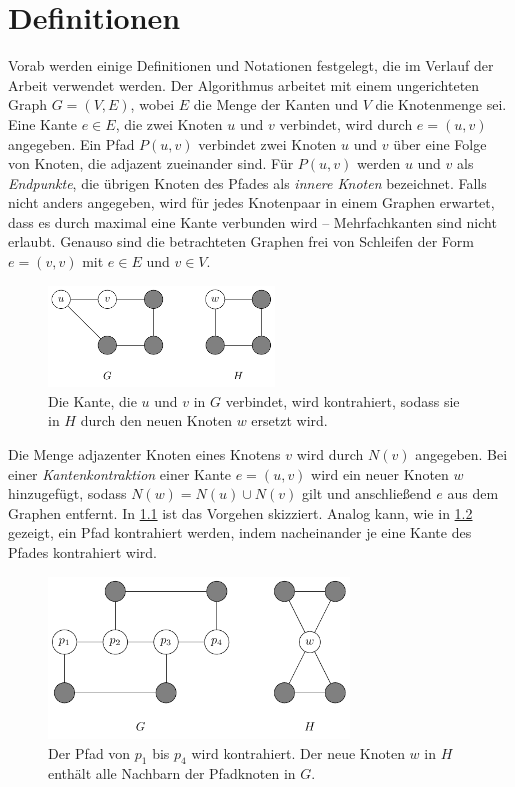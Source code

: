 \chapter{Definitionen}
\label{cha:definitionen}

Vorab werden einige Definitionen und Notationen festgelegt, die im Verlauf der Arbeit verwendet werden.
Der Algorithmus arbeitet mit einem ungerichteten Graph $G = (V, E)$, wobei $E$ die Menge der Kanten und $V$ die Knotenmenge sei.
Eine Kante $e \in E$, die zwei Knoten $u$ und $v$ verbindet, wird durch $e = (u, v)$ angegeben.
Ein Pfad $P(u, v)$ verbindet zwei Knoten $u$ und $v$ über eine Folge von Knoten, die adjazent zueinander sind.
Für $P(u, v)$ werden $u$ und $v$ als \emph{Endpunkte}, die übrigen Knoten des Pfades als \emph{innere Knoten} bezeichnet.
Falls nicht anders angegeben, wird für jedes Knotenpaar in einem Graphen erwartet, dass es durch maximal eine Kante verbunden wird -- Mehrfachkanten sind nicht erlaubt.
Genauso sind die betrachteten Graphen frei von Schleifen der Form $e = (v, v)$ mit $e \in E$ und $v \in V$.
\begin{figure}
  \includegraphics[width=6cm]{bilder/Kantenkontraktion.pdf}
  \caption{Die Kante, die $u$ und $v$ in $G$ verbindet, wird kontrahiert, sodass sie in $H$ durch den neuen Knoten $w$ ersetzt wird.}
  \label{fig:Kantenkontraktion}
\end{figure}
Die Menge adjazenter Knoten eines Knotens $v$ wird durch $N(v)$ angegeben.
Bei einer \emph{Kantenkontraktion} einer Kante $e = (u, v)$ wird ein neuer Knoten $w$ hinzugefügt, sodass $N(w) = N(u) \cup N(v)$ gilt und anschließend $e$ aus dem Graphen entfernt.
In \Abb \ref{fig:Kantenkontraktion} ist das Vorgehen skizziert.
Analog kann, wie in \Abb \ref{fig:Pfadkontraktion} gezeigt, ein Pfad kontrahiert werden, indem nacheinander je eine Kante des Pfades kontrahiert wird.
\begin{figure}[H]
  \centering
  \includegraphics[width=8cm]{bilder/Pfadkontraktion.pdf}
  \caption{Der Pfad von $p_1$ bis $p_4$ wird kontrahiert.
           Der neue Knoten $w$ in $H$ enthält alle Nachbarn der Pfadknoten in $G$.}
  \label{fig:Pfadkontraktion}
\end{figure}

